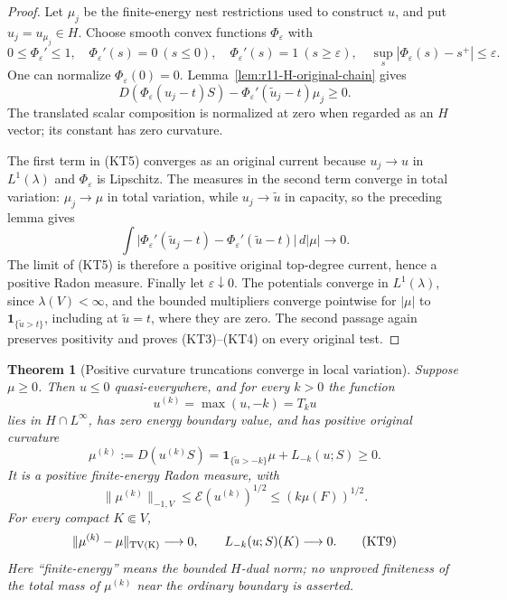 \documentclass[11pt,a4paper]{article}
\numberwithin{equation}{section}
\newtheorem{theorem}{Theorem}[section]
\theoremstyle{definition}
\theoremstyle{remark}
\begin{document}
\begin{proof}
Let $\mu_j$ be the finite-energy nest restrictions used to construct
$u$, and put $u_j=u_{\mu_j}\in H$.
Choose smooth convex functions $\Phi_\varepsilon$ with
\[
 0\le\Phi_\varepsilon'\le1,\quad
 \Phi_\varepsilon'(s)=0\ (s\le0),\quad
 \Phi_\varepsilon'(s)=1\ (s\ge\varepsilon),\quad
 \sup_s|\Phi_\varepsilon(s)-s^+|\le\varepsilon.
\]
One can normalize $\Phi_\varepsilon(0)=0$.
Lemma~\ref{lem:r11-H-original-chain} gives
\[
 D(\Phi_\varepsilon(u_j-t)S)
             -\Phi_\varepsilon'(\widetilde u_j-t)\mu_j\ge0.
 \tag{KT5}
\]
The translated scalar composition is normalized at zero when
regarded as an $H$ vector; its constant has zero curvature.

The first term in (KT5) converges as an original current because
$u_j\to u$ in $L^1(\lambda)$ and $\Phi_\varepsilon$ is Lipschitz.
The measures in the second term converge in total variation:
$\mu_j\to\mu$ in total variation, while
$u_j\to\widetilde u$ in capacity, so the preceding lemma gives
\[
 \int\bigl|\Phi_\varepsilon'(\widetilde u_j-t)
            -\Phi_\varepsilon'(\widetilde u-t)\bigr|\,d|\mu|
                                                       \longrightarrow0.
\]
The limit of (KT5) is therefore a positive original top-degree
current, hence a positive Radon measure.
Finally let $\varepsilon\downarrow0$.
The potentials converge in $L^1(\lambda)$, since
$\lambda(V)<\infty$, and the bounded multipliers converge
pointwise for $|\mu|$ to $\mathbf1_{\{\widetilde u>t\}}$,
including at $\widetilde u=t$, where they are zero.
The second passage again preserves positivity and proves
(KT3)--(KT4) on every original test.
\end{proof}

\begin{theorem}[Positive curvature truncations converge in local variation]
\label{thm:r11-diffuse-positive-curvature-truncation}
Suppose $\mu\ge0$.  Then $u\le0$ quasi-everywhere, and for every
$k>0$ the function
\[
                       u^{(k)}=\max(u,-k)=T_k u
 \tag{KT6}
\]
lies in $H\cap L^\infty$, has zero energy boundary value, and
has positive original curvature
\[
 \mu^{(k)}:=D(u^{(k)}S)
       =\mathbf1_{\{\widetilde u>-k\}}\mu+L_{-k}(u;S)\ge0.
 \tag{KT7}
\]
It is a positive finite-energy Radon measure, with
\[
       \|\mu^{(k)}\|_{-1,V}\le\mathcal E(u^{(k)})^{1/2}
                                      \le(k\mu(F))^{1/2}.
 \tag{KT8}
\]
For every compact $K\Subset V$,
\[
 \|\mu^{(k)}-\mu\|_{\rm TV(K)}\longrightarrow0,
 \qquad L_{-k}(u;S)(K)\longrightarrow0.
 \tag{KT9}
\]
Here ``finite-energy'' means the bounded $H$-dual norm; no
unproved finiteness of the total mass of $\mu^{(k)}$ near the
ordinary boundary is asserted.
\end{theorem}
\end{document}
